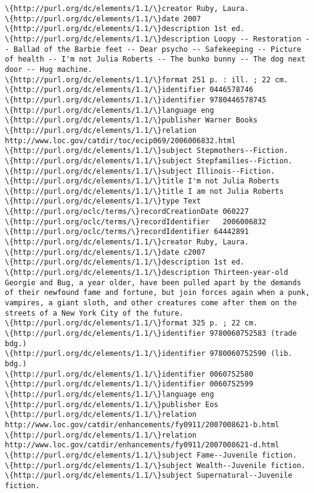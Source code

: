 \documentclass[11pt]{article}
\begin{document}
\begin{Verbatim}[commandchars=\\\{\}]
\{http://purl.org/dc/elements/1.1/\}creator Ruby, Laura.
\{http://purl.org/dc/elements/1.1/\}date 2007
\{http://purl.org/dc/elements/1.1/\}description 1st ed.
\{http://purl.org/dc/elements/1.1/\}description Loopy -- Restoration -- Ballad of the Barbie feet -- Dear psycho -- Safekeeping -- Picture of health -- I'm not Julia Roberts -- The bunko bunny -- The dog next door -- Hug machine.
\{http://purl.org/dc/elements/1.1/\}format 251 p. : ill. ; 22 cm.
\{http://purl.org/dc/elements/1.1/\}identifier 0446578746
\{http://purl.org/dc/elements/1.1/\}identifier 9780446578745
\{http://purl.org/dc/elements/1.1/\}language eng
\{http://purl.org/dc/elements/1.1/\}publisher Warner Books
\{http://purl.org/dc/elements/1.1/\}relation http://www.loc.gov/catdir/toc/ecip069/2006006832.html
\{http://purl.org/dc/elements/1.1/\}subject Stepmothers--Fiction.
\{http://purl.org/dc/elements/1.1/\}subject Stepfamilies--Fiction.
\{http://purl.org/dc/elements/1.1/\}subject Illinois--Fiction.
\{http://purl.org/dc/elements/1.1/\}title I'm not Julia Roberts 
\{http://purl.org/dc/elements/1.1/\}title I am not Julia Roberts
\{http://purl.org/dc/elements/1.1/\}type Text
\{http://purl.org/oclc/terms/\}recordCreationDate 060227
\{http://purl.org/oclc/terms/\}recordIdentifier   2006006832
\{http://purl.org/oclc/terms/\}recordIdentifier 64442891
\{http://purl.org/dc/elements/1.1/\}creator Ruby, Laura.
\{http://purl.org/dc/elements/1.1/\}date c2007
\{http://purl.org/dc/elements/1.1/\}description 1st ed.
\{http://purl.org/dc/elements/1.1/\}description Thirteen-year-old Georgie and Bug, a year older, have been pulled apart by the demands of their newfound fame and fortune, but join forces again when a punk, vampires, a giant sloth, and other creatures come after them on the streets of a New York City of the future.
\{http://purl.org/dc/elements/1.1/\}format 325 p. ; 22 cm.
\{http://purl.org/dc/elements/1.1/\}identifier 9780060752583 (trade bdg.)
\{http://purl.org/dc/elements/1.1/\}identifier 9780060752590 (lib. bdg.)
\{http://purl.org/dc/elements/1.1/\}identifier 0060752580
\{http://purl.org/dc/elements/1.1/\}identifier 0060752599
\{http://purl.org/dc/elements/1.1/\}language eng
\{http://purl.org/dc/elements/1.1/\}publisher Eos
\{http://purl.org/dc/elements/1.1/\}relation http://www.loc.gov/catdir/enhancements/fy0911/2007008621-b.html
\{http://purl.org/dc/elements/1.1/\}relation http://www.loc.gov/catdir/enhancements/fy0911/2007008621-d.html
\{http://purl.org/dc/elements/1.1/\}subject Fame--Juvenile fiction.
\{http://purl.org/dc/elements/1.1/\}subject Wealth--Juvenile fiction.
\{http://purl.org/dc/elements/1.1/\}subject Supernatural--Juvenile fiction.

\end{Verbatim}
\end{document}
